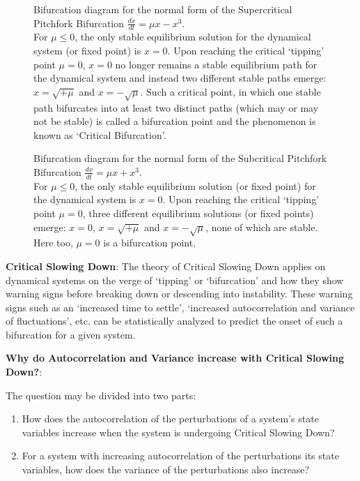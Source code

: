 \begin{figure}[!ht]
	\caption{Bifurcation diagram for the normal form of the Supercritical Pitchfork Bifurcation $\frac{dx}{dt} = \mu x - x^3$. \\ For $\mu \leq 0$, the only stable equilibrium solution for the dynamical system (or fixed point) is $x=0$. Upon reaching the critical `tipping' point $\mu=0$, $x=0$ no longer remains a stable equilibrium path for the dynamical system and instead two different stable paths emerge: $x = \sqrt{+\mu}$ and $x = -\sqrt{\mu}$. Such a critical point, in which one stable path bifurcates into at least two distinct paths (which may or may not be stable) is called a bifurcation point and the phenomenon is known as `Critical Bifurcation'.}
	\label{fig:bifPitchforkSupercritical}
\end{figure}

\begin{figure}[!ht]
	\caption{Bifurcation diagram for the normal form of the Subcritical Pitchfork Bifurcation $\frac{dx}{dt} = \mu x + x^3$. \\ For $\mu \leq 0$, the only stable equilibrium solution (or fixed point) for the dynamical system is $x=0$. Upon reaching the critical `tipping' point $\mu=0$, three different equilibrium solutions (or fixed points) emerge: $x=0$, $x = \sqrt{+\mu}$ and $x = -\sqrt{\mu}$, none of which are stable. Here too, $\mu=0$ is a bifurcation point.}
	\label{fig:bifPitchforkSubcritical}
\end{figure}


\textbf{Critical Slowing Down}: The theory of Critical Slowing Down applies on dynamical systems on the verge of `tipping' or `bifurcation' and how they show warning signs before breaking down or descending into instability. These warning signs such as an `increased time to settle', `increased autocorrelation and variance of fluctuations', etc. \cite{schefferEarlyWarningSignalsForCriticalTransitions} can be statistically analyzed to predict the onset of such a bifurcation for a given system.

\noindent \textbf{Why do Autocorrelation and Variance increase with Critical Slowing Down?}:

The question may be divided into two parts:
\begin{enumerate}
	\item How does the autocorrelation of the perturbations of a system's state variables increase when the system is undergoing Critical Slowing Down?
	\item For a system with increasing autocorrelation of the perturbations its state variables, how does the variance of the perturbations also increase?
\end{enumerate}

